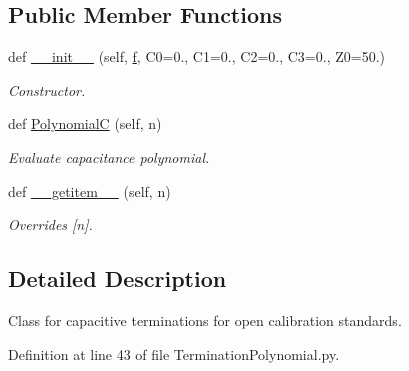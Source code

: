 \subsection*{Public Member Functions}
\begin{DoxyCompactItemize}
\item 
def \hyperlink{classSignalIntegrity_1_1Measurement_1_1CalKit_1_1Standards_1_1TerminationPolynomial_1_1TerminationCPolynomial_aec9ef08a9bd3bdd31ca01580d655143d}{\+\_\+\+\_\+init\+\_\+\+\_\+} (self, \hyperlink{classSignalIntegrity_1_1SParameters_1_1SParameters_1_1SParameters_a32e7a34d6837fe949b413c852a0447f8}{f}, C0=0., C1=0., C2=0., C3=0., Z0=50.)
\begin{DoxyCompactList}\small\item\em Constructor. \end{DoxyCompactList}\item 
def \hyperlink{classSignalIntegrity_1_1Measurement_1_1CalKit_1_1Standards_1_1TerminationPolynomial_1_1TerminationCPolynomial_a03914e112a09cbcbc1c25192a1048d0a}{PolynomialC} (self, n)
\begin{DoxyCompactList}\small\item\em Evaluate capacitance polynomial. \end{DoxyCompactList}\item 
def \hyperlink{classSignalIntegrity_1_1Measurement_1_1CalKit_1_1Standards_1_1TerminationPolynomial_1_1TerminationCPolynomial_ab7a6da5139e0878b590d68292aaa70f2}{\+\_\+\+\_\+getitem\+\_\+\+\_\+} (self, n)
\begin{DoxyCompactList}\small\item\em Overrides \mbox{[}n\mbox{]}. \end{DoxyCompactList}\end{DoxyCompactItemize}


\subsection{Detailed Description}
Class for capacitive terminations for open calibration standards. 

Definition at line 43 of file Termination\+Polynomial.\+py.



